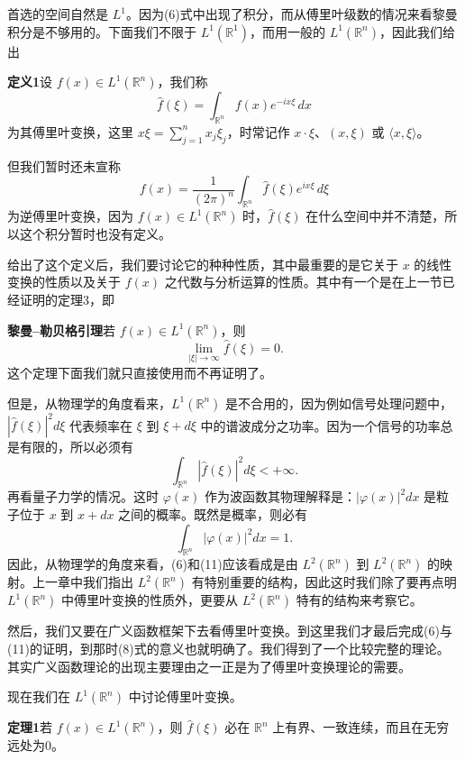 首选的空间自然是 $L^1$。因为(6)式中出现了积分，而从傅里叶级数的情况来看黎曼积分是不够用的。下面我们不限于 $L^1(\mathbb R^1)$，而用一般的 $L^1(\mathbb R^n)$，因此我们给出

\noindent\textbf{定义1}\quad 设 $f(x)\in L^1(\mathbb R^n)$，我们称
\begin{equation}
 \widehat f(\xi)=\int_{\mathbb R^n}f(x)e^{-ix\xi}\,dx
 \tag{12}
\end{equation}
为其傅里叶变换，这里 $x\xi=\sum_{j=1}^nx_j\xi_j$，时常记作 $x\cdot\xi$、$(x,\xi)$ 或 $\langle x,\xi\rangle$。

但我们暂时还未宣称
\[
 f(x)=\frac1{(2\pi)^n}\int_{\mathbb R^n}\widehat f(\xi)e^{ix\xi}\,d\xi
\]
为逆傅里叶变换，因为 $f(x)\in L^1(\mathbb R^n)$ 时，$\widehat f(\xi)$ 在什么空间中并不清楚，所以这个积分暂时也没有定义。

给出了这个定义后，我们要讨论它的种种性质，其中最重要的是它关于 $x$ 的线性变换的性质以及关于 $f(x)$ 之代数与分析运算的性质。其中有一个是在上一节已经证明的定理3，即

\noindent\textbf{黎曼--勒贝格引理}\quad 若 $f(x)\in L^1(\mathbb R^n)$，则
\[
 \lim_{|\xi|\to\infty}\widehat f(\xi)=0.
\]
这个定理下面我们就只直接使用而不再证明了。

但是，从物理学的角度看来，$L^1(\mathbb R^n)$ 是不合用的，因为例如信号处理问题中，$|\widehat f(\xi)|^2d\xi$ 代表频率在 $\xi$ 到 $\xi+d\xi$ 中的谱波成分之功率。因为一个信号的功率总是有限的，所以必须有
\[
 \int_{\mathbb R^n}|\widehat f(\xi)|^2d\xi<+\infty.
\]
再看量子力学的情况。这时 $\varphi(x)$ 作为波函数其物理解释是：$|\varphi(x)|^2dx$ 是粒子位于 $x$ 到 $x+dx$ 之间的概率。既然是概率，则必有
\[
 \int_{\mathbb R^n}|\varphi(x)|^2dx=1.
\]
因此，从物理学的角度来看，(6)和(11)应该看成是由 $L^2(\mathbb R^n)$ 到 $L^2(\mathbb R^n)$ 的映射。上一章中我们指出 $L^2(\mathbb R^n)$ 有特别重要的结构，因此这时我们除了要再点明 $L^1(\mathbb R^n)$ 中傅里叶变换的性质外，更要从 $L^2(\mathbb R^n)$ 特有的结构来考察它。

然后，我们又要在广义函数框架下去看傅里叶变换。到这里我们才最后完成(6)与(11)的证明，到那时(8)式的意义也就明确了。我们得到了一个比较完整的理论。其实广义函数理论的出现主要理由之一正是为了傅里叶变换理论的需要。

现在我们在 $L^1(\mathbb R^n)$ 中讨论傅里叶变换。

\noindent\textbf{定理1}\quad 若 $f(x)\in L^1(\mathbb R^n)$，则 $\widehat f(\xi)$ 必在 $\mathbb R^n$ 上有界、一致连续，而且在无穷远处为0。

